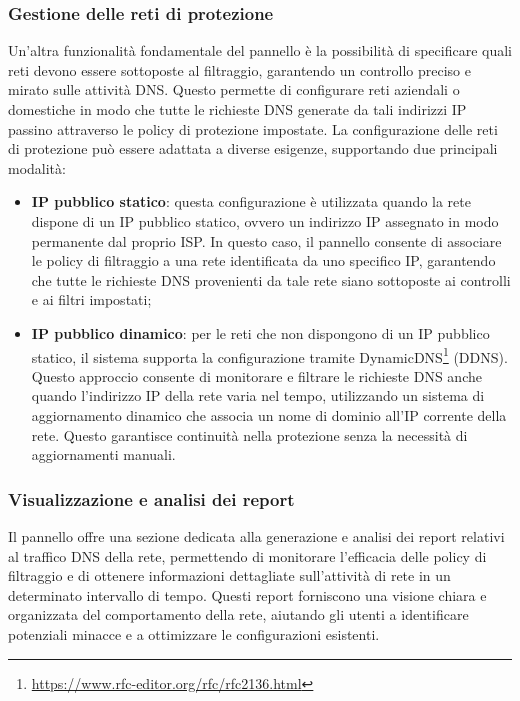 \subsubsection{Gestione delle reti di protezione}
Un'altra funzionalità fondamentale del pannello è la possibilità di specificare quali reti devono essere sottoposte al filtraggio, garantendo un controllo preciso e mirato sulle attività DNS. Questo permette di configurare reti aziendali o domestiche in modo che tutte le richieste DNS generate da tali indirizzi IP passino attraverso le policy di protezione impostate. La configurazione delle reti di protezione può essere adattata a diverse esigenze, supportando due principali modalità:
\begin{itemize}
  \item \textbf{IP pubblico statico}: questa configurazione è utilizzata quando la rete dispone di un IP pubblico statico, ovvero un indirizzo IP assegnato in modo permanente dal proprio ISP. In questo caso, il pannello consente di associare le policy di filtraggio a una rete identificata da uno specifico IP, garantendo che tutte le richieste DNS provenienti da tale rete siano sottoposte ai controlli e ai filtri impostati;

  \item \textbf{IP pubblico dinamico}: per le reti che non dispongono di un IP pubblico statico, il sistema supporta la configurazione tramite DynamicDNS\footnote{\url{https://www.rfc-editor.org/rfc/rfc2136.html}} (DDNS). Questo approccio consente di monitorare e filtrare le richieste DNS anche quando l’indirizzo IP della rete varia nel tempo, utilizzando un sistema di aggiornamento dinamico che associa un nome di dominio all’IP corrente della rete. Questo garantisce continuità nella protezione senza la necessità di aggiornamenti manuali.
\end{itemize}

\subsubsection{Visualizzazione e analisi dei report}
Il pannello offre una sezione dedicata alla generazione e analisi dei report relativi al traffico DNS della rete, permettendo di monitorare l’efficacia delle policy di filtraggio e di ottenere informazioni dettagliate sull’attività di rete in un determinato intervallo di tempo. Questi report forniscono una visione chiara e organizzata del comportamento della rete, aiutando gli utenti a identificare potenziali minacce e a ottimizzare le configurazioni esistenti.

